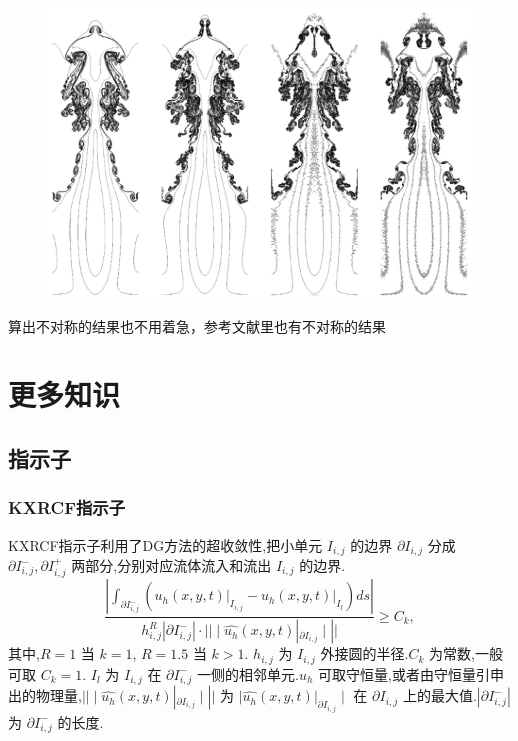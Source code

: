 \documentclass{book}
\begin{document}
\begin{example}
    \begin{figure}[htp]
        \centering
        \label{fig:}
        \includegraphics[width=0.7\linewidth]{fig/RT_proble.png}
        \caption{}
    \end{figure}

    算出不对称的结果也不用着急，参考文献里也有不对称的结果~\cite{shi2003resolution}
\end{example}






\chapter{更多知识}
\section{指示子}
\subsection{KXRCF指示子}
KXRCF指示子利用了DG方法的超收敛性\cite{RN92},把小单元 $I_{i,j}$ 的边界 $\partial I_{i,j}$ 分成 $\partial I_{i,j}^-,\partial I_{i,j}^+$ 两部分,分别对应流体流入和流出 $I_{i,j}$ 的边界.
\begin{equation}
    \frac{\left|\int_{\partial I_{i, j}^{-}}\left(\left.u_{h}(x, y, t)\right|_{I_{i, j}}-\left.u_{h}(x, y, t)\right|_{I_{l}}\right) d s\right|}{h_{i, j}^{R}\left|\partial I_{i, j}^{-}\right| \cdot||\mid \widehat{u_{h}}(x, y, t)|_{\partial I_{i, j}}\mid||} \geq C_{k},
\end{equation}
其中,$R=1$ 当 $k=1$, $R=1.5$ 当 $k>1$. $h_{i,j}$ 为 $I_{i,j}$ 外接圆的半径.$C_k$ 为常数,一般可取 $C_k = 1$. $I_l$ 为 $I_{i,j}$ 在 $\partial I_{i,j}^-$ 一侧的相邻单元.$u_h$ 可取守恒量,或者由守恒量引申出的物理量,$||\mid \widehat{u_{h}}(x, y, t)|_{\partial I_{i, j}}\mid||$ 为 $\mid \widehat{u_{h}}(x, y, t)|_{\partial I_{i, j}}\mid$ 在 $\partial I_{i,j}$ 上的最大值.$|\partial I_{i,j}^-|$ 为 $\partial I_{i,j}^-$ 的长度.
\end{document}
